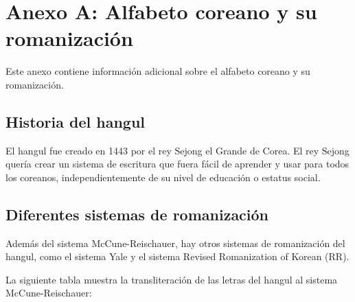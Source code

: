 \section{Anexo A: Alfabeto coreano y su romanización}

Este anexo contiene información adicional sobre el alfabeto coreano y su romanización.

\subsection{Historia del hangul}

El hangul fue creado en 1443 por el rey Sejong el Grande de Corea. El rey Sejong quería crear un sistema de escritura que fuera fácil de aprender y usar para todos los coreanos, independientemente de su nivel de educación o estatus social.

\subsection{Diferentes sistemas de romanización}

Además del sistema McCune-Reischauer, hay otros sistemas de romanización del hangul, como el sistema Yale y el sistema Revised Romanization of Korean (RR).

La siguiente tabla muestra la transliteración de las letras del hangul al sistema McCune-Reischauer:


